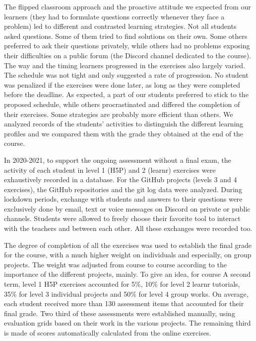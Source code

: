 \documentclass{aims}
\theoremstyle{definition}
\begin{document}
The flipped classroom approach and the proactive attitude we expected
from our learners (they had to formulate questions correctly whenever
they face a problem) led to different and contrasted learning
strategies. Not all students asked questions. Some of them tried to find
solutions on their own. Some others preferred to ask their questions
privately, while others had no problems exposing their difficulties on a
public forum (the Discord channel dedicated to the course). The way and
the timing learners progressed in the exercises also largely varied. The
schedule was not tight and only suggested a rate of progression. No
student was penalized if the exercises were done later, as long as they
were completed before the deadline. As expected, a part of our students
preferred to stick to the proposed schedule, while others procrastinated
and differed the completion of their exercises. Some strategies are
probably more efficient than others. We analyzed records of the
students' activities to distinguish the different learning profiles and
we compared them with the grade they obtained at the end of the course.

In 2020-2021, to support the ongoing assessment without a final exam,
the activity of each student in level 1 (H5P) and 2 (learnr) exercises
were exhaustively recorded in a database. For the GitHub projects
(levels 3 and 4 exercises), the GitHub repositories and the git log data
were analyzed. During lockdown periods, exchange with students and
answers to their questions were exclusively done by email, text or voice
messages on Discord on private or public channels. Students were allowed
to freely choose their favorite tool to interact with the teachers and
between each other. All these exchanges were recorded too.

The degree of completion of all the exercises was used to establish the
final grade for the course, with a much higher weight on individuals and
especially, on group projects. The weight was adjusted from course to
course according to the importance of the different projects, mainly. To
give an idea, for course A second term, level 1 H5P exercises accounted
for 5\%, 10\% for level 2 learnr tutorials, 35\% for level 3 individual
projects and 50\% for level 4 group works. On average, each student
received more than 130 assessment items that accounted for their final
grade. Two third of these assessments were established manually, using
evaluation grids based on their work in the various projects. The
remaining third is made of scores automatically calculated from the
online exercises.
\end{document}
